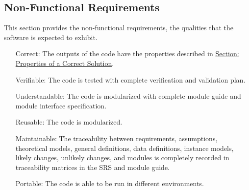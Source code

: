 \documentclass[12pt]{article}
\begin{document}
\subsection{Non-Functional Requirements}
\label{Sec:NFRs}
This section provides the non-functional requirements, the qualities that the software is expected to exhibit.
\begin{itemize}
\item[Correct:\phantomsection\label{correct}]{The outputs of the code have the properties described in \hyperref[Sec:CorSolProps]{Section: Properties of a Correct Solution}.}
\item[Verifiable:\phantomsection\label{verifiable}]{The code is tested with complete verification and validation plan.}
\item[Understandable:\phantomsection\label{understandable}]{The code is modularized with complete module guide and module interface specification.}
\item[Reusable:\phantomsection\label{reusable}]{The code is modularized.}
\item[Maintainable:\phantomsection\label{maintainable}]{The traceability between requirements, assumptions, theoretical models, general definitions, data definitions, instance models, likely changes, unlikely changes, and modules is completely recorded in traceability matrices in the SRS and module guide.}
\item[Portable:\phantomsection\label{portable}]{The code is able to be run in different environments.}
\end{itemize}
\end{document}
